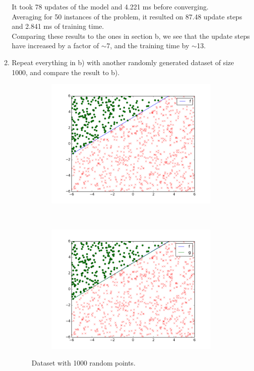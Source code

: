 \documentclass{article}
\begin{document}
\begin{enumerate}[label=(\alph*)]
It took 78 updates of the model and 4.221 ms before converging.\\
Averaging for 50 instances of the problem, it resulted on 87.48 update steps and 2.841 ms of training time.\\
Comparing these results to the ones in section b, we see that the update steps have increased by a factor of $\sim$7, and the training time by $\sim$13.

\item Repeat everything in b) with another randomly generated dataset of size 1000, and compare the result to b).

\begin{figure}[H]
    \centering
    \begin{subfigure}[t]{0.5\textwidth}
        \centering
		\includegraphics[scale=0.35]{images/5_a.png} 
    \end{subfigure}%
    ~ 
    \begin{subfigure}[t]{0.5\textwidth}
        \centering
		\includegraphics[scale=0.35]{images/5_b.png} 
    \end{subfigure}
    \caption{Dataset with 1000 random points.}
\end{figure}


\end{enumerate}
\end{document}
